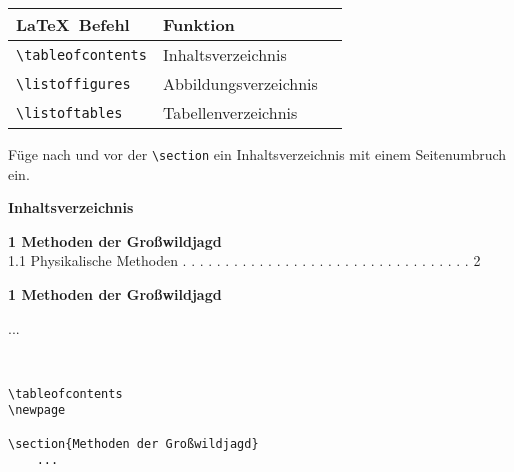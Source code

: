 \begin{frame}[fragile]
	\begin{center}
		\begin{tabular}{lll}
			\toprule
			\LaTeX\ Befehl					&	Funktion				\\ \midrule
			\lstinline|\tableofcontents|	&	Inhaltsverzeichnis		\\
			\lstinline|\listoffigures|		&	Abbildungsverzeichnis	\\
			\lstinline|\listoftables| 		&	Tabellenverzeichnis		\\ \bottomrule
		\end{tabular}
	\end{center}

	\pause\btVFill
	\Aufgabee
	Füge nach \lstinline[basicstyle=\normalfont\ttfamily\normalsize]|| und vor der \lstinline[basicstyle=\normalfont\ttfamily\normalsize]|\section| ein Inhaltsverzeichnis mit einem Seitenumbruch ein.
	\vspace{1.3cm}
\end{frame}
\begin{frame}[fragile]
	\Losung
	\begin{outputbox}
		{\large\textbf{Inhaltsverzeichnis}}
		
		{\textbf{1 \hspace{4pt} Methoden der Großwildjagd}} \\
		{\hspace{12pt} 1.1 Physikalische Methoden . . . . . . . . . . . . . . . . . . . . . . . . . . . . . . . . . . \hspace{4pt}  2}
	\end{outputbox}
	\linebreakrule
	\begin{outputbox}
		{ \LARGE\textbf{1 Methoden der Großwildjagd}}
		
		...
	\end{outputbox}

	\Code
	\begin{lstlisting}

	
\tableofcontents
\newpage 
	
\section{Methoden der Großwildjagd}
	...
	\end{lstlisting}
\end{frame}
